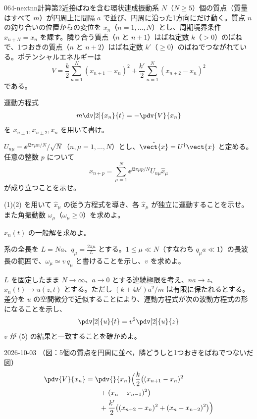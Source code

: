 \documentclass[uplatex,dvipdfmx,a4paper,11pt]{jsarticle}
\begin{document}
\begin{mondai}{064-nextnn}{計算}{第2近接ばねを含む環状連成振動系}
$N$（$N\ge5$）個の質点（質量はすべて $m$）が円周上に間隔 $a$ で並び、円周に沿った1方向にだけ動く。質点 $n$ の釣り合いの位置からの変位を $x_n$（$n=1,\dots,N$）とし、周期境界条件 $x_{n+N}=x_n$ を課す。隣り合う質点（$n$ と $n+1$）はばね定数 $k$（$>0$）のばねで、1つおきの質点（$n$ と $n+2$）はばね定数 $k'$（$\ge0$）のばねでつながれている。ポテンシャルエネルギーは
\[
V=\frac{k}{2}\sum_{n=1}^{N}(x_{n+1}-x_n)^{2}+\frac{k'}{2}\sum_{n=1}^{N}(x_{n+2}-x_n)^{2}
\]
である。
\begin{shoumon}
  \item 運動方程式
\[
m\dv[2]{x_n}{t}=-\pdv{V}{x_n}
\]
を $x_{n\pm1},x_{n\pm2},x_n$ を用いて書け。
  \item $U_{n\mu}=\ee^{\ii2\pi\mu n/N}/\sqrt{N}$（$n,\mu=1,\dots,N$）とし、$\hat{\vect{x}}=U^{\dagger}\vect{x}$ と定める。任意の整数 $p$ について
\[
x_{n+p}=\sum_{\mu=1}^{N}\ee^{\ii2\pi\mu p/N}U_{n\mu}\hat{x}_{\mu}
\]
が成り立つことを示せ。
  \item (1)(2) を用いて $\hat{x}_{\mu}$ の従う方程式を導き、各 $\hat{x}_{\mu}$ が独立に運動することを示せ。また角振動数 $\omega_{\mu}$（$\omega_{\mu}\ge0$）を求めよ。
  \item $x_n(t)$ の一般解を求めよ。
  \item 系の全長を $L=Na$、$q_{\mu}=\frac{2\pi\mu}{L}$ とする。$1\le\mu\ll N$（すなわち $q_{\mu}a\ll1$）の長波長の範囲で、$\omega_{\mu}\simeq v\,q_{\mu}$ と書けることを示し、$v$ を求めよ。
  \item $L$ を固定したまま $N\to\infty$、$a\to0$ とする連続極限を考え、$na\to z$、$x_n(t)\to u(z,t)$ とする。ただし $(k+4k')a^{2}/m$ は有限に保たれるとする。差分を $u$ の空間微分で近似することにより、運動方程式が次の波動方程式の形になることを示し、
\[
\pdv[2]{u}{t}=v^{2}\pdv[2]{u}{z}
\]
$v$ が (5) の結果と一致することを確かめよ。
\end{shoumon}
\begin{kotaeutsushi}{2026-10-03}
（図：5個の質点を円周に並べ，隣どうしと1つおきをばねでつないだ図）
\begin{align*}
  \pdv{V}{x_n}&=\pdv{}{x_n}\Bigl(\frac{k}{2}\bigl((x_{n+1}-x_n)^{2}\\
  &\qquad+(x_n-x_{n-1})^{2}\bigr)\\
  &\qquad+\frac{k'}{2}\bigl((x_{n+2}-x_n)^{2}+(x_n-x_{n-2})^{2}\bigr)\Bigr)\\

\end{align*}
\end{kotaeutsushi}
\end{mondai}
\end{document}
